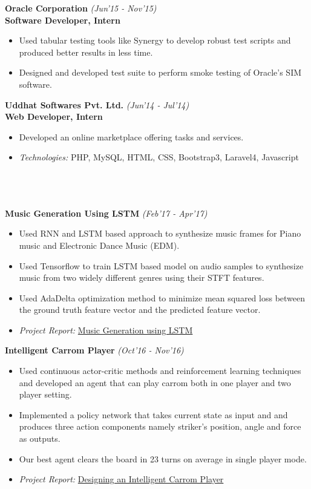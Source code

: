 \documentclass[a4paper,10pt]{article}
\newcommand{\lsep}{-0.5cm}
\newcommand{\resheading}[1]{{\small \colorbox{mygrey}{\begin{minipage}{0.975\textwidth}{\textbf{#1 \vphantom{p\^{E}}}}\end{minipage} \hspace{0.2cm}}}}
\begin{document}
\indent\small{\textbf{Oracle Corporation}}	\hfill	\small{\textit{(Jun'15 - Nov'15)}} \\
\indent\small{\textbf{Software Developer, Intern}}
\begin{itemize}
\item \noindent \small{Used tabular testing tools like Synergy to develop robust test scripts and produced better results in less time.}
\\[-0.5cm]
\item \noindent \small{Designed and developed test suite to perform smoke testing of Oracle's SIM software.}
\end{itemize}

\indent \small{\textbf{Uddhat Softwares Pvt. Ltd.}}	\hfill	\small{\textit{(Jun'14 - Jul'14)}} \\
\indent \small{\textbf{Web Developer, Intern}}
\begin{itemize}
\item \noindent \small{Developed an online marketplace offering tasks and services.}
\\[-0.5cm]
\item \noindent \small{\textit{Technologies:} PHP, MySQL, HTML, CSS, Bootstrap3, Laravel4, Javascript}
\end{itemize}

\indent \resheading{\textbf{PROJECTS}}\\[\lsep]
\\ \\
\indent\small{\textbf{Music Generation Using LSTM}}	\hfill	\small{\textit{(Feb'17 - Apr'17)}}
\begin{itemize}
 \item Used RNN and LSTM based approach to synthesize music frames for Piano music and Electronic Dance Music (EDM).
 \item Used Tensorflow to train LSTM based model on audio samples to synthesize music from two widely different genres using their STFT features.
 \item Used AdaDelta optimization method to minimize mean squared loss between the ground truth feature vector and the predicted feature vector.
 \item \textit{Project Report: } \href{https://goo.gl/wSzUxP}{Music Generation using LSTM}
\end{itemize}

\indent\small{\textbf{Intelligent Carrom Player}} \hfill	\small{\textit{(Oct'16 - Nov'16)}}
\begin{itemize}
 \item Used continuous actor-critic methods and reinforcement learning techniques and developed an agent that can play carrom both in one player and two player setting.
 \item Implemented a policy network that takes current state as input and and produces three action components namely striker's position, angle and force as outputs.
 \item Our best agent clears the board in 23 turns on average in single player mode.
 \item \textit{Project Report: } \href{https://goo.gl/2Csvi8}{Designing an Intelligent Carrom Player}
\end{itemize}
\end{document}

